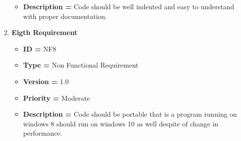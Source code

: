 \documentclass[a4paper, 12pt]{article}
\begin{document}
\begin{enumerate}[noitemsep]
\begin{itemize}[noitemsep]
            \item\textbf{Description = }   Code should be well indented and easy to understand with proper documentation. 
        \end{itemize}
        \item \textbf{Eigth Requirement}
        \begin{itemize}[noitemsep]
            \item \textbf{ID = } NF8
            \item\textbf{Type = } Non Functional Requirement
            \item\textbf{Version = } 1.0
            \item\textbf{Priority = } Moderate
            \item\textbf{Description = }   Code should be portable that is a program running on windows 8 should run on windows 10 as well despite of change in performance. 
        \end{itemize}
        \newpage
    \end{enumerate}
\end{document}
